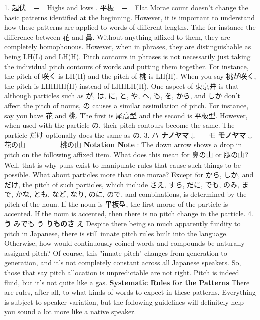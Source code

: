\par{1. 起伏　＝　Highs and lows \hfill{}. 平板　＝　Flat }
 Morae count doesn't change the basic patterns identified at the beginning. However, it is important to understand how these patterns are applied to words of different lengths. Take for instance the difference between 花 and 鼻. Without anything affixed to them, they are completely homophonous. However, when in phrases, they are distinguishable as being LH(L) and LH(H).   Pitch contours in phrases is not necessarily just taking the individual pitch contours of words and putting them together. For instance, the pitch of 咲く is LH(H) and the pitch of 桃 is LH(H). When you say 桃が咲く, the pitch is LHHHH(H) instead of LHHLH(H).   One aspect of 東京弁 is that although particles such as が, は, に, と, や, へ, も, を, から, and しか don't affect the pitch of nouns, の causes a similar assimilation of pitch. For instance, say you have 花 and 桃. The first is 尾高型 and the second is 平板型. However, when used with the particle の, their pitch contours become the same. The particle だけ optionally does the same as の.  3. ハ \textbf{ナノヤマ }↓　　モ \textbf{モノヤマ }↓ \hfill\break
花の山　     　　桃の山 \hfill\break
\textbf{Notation Note }: The down arrow shows a drop in pitch on the following affixed item.   What does this mean for 鼻の山 or 腿の山? Well, that is why puns exist to manipulate rules that cause such things to be possible.   What about particles more than one morae? Except for から, しか, and だけ, the pitch of such particles, which include さえ, すら, だに, でも, のみ, まで, かな, とも, など, なり, のに, ので, and combinations, is determined by the pitch of the noun. If the noun is 平板型, the first morae of the particle is accented. If the noun is accented, then there is no pitch change in the particle.  4. \textbf{う }みでも  う \textbf{りものさ }え   Despite there being so much apparently fluidity to pitch in Japanese, there is still innate pitch rules built into the language. Otherwise, how would continuously coined words and compounds be naturally assigned pitch? Of course, this "innate pitch" changes from generation to generation, and it's not completely constant across all Japanese speakers. So, those that say pitch allocation is unpredictable are not right. Pitch is indeed fluid, but it's not quite like a gas.  \textbf{Systematic Rules for the Patterns }   There are rules, after all, to what kinds of words to expect in these patterns. Everything is subject to speaker variation, but the following guidelines will definitely help you sound a lot more like a native speaker.  
